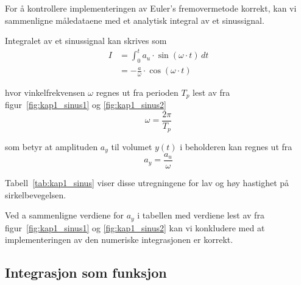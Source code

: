 \documentclass[main.tex]{subfiles}
\begin{document}




For å kontrollere implementeringen av Euler's fremovermetode korrekt, kan vi sammenligne måledataene med et analytisk integral av et sinussignal.

Integralet av et sinussignal kan skrives som
\begin{align}
    I & = \int_{0}^{t} a_u \cdot \sin{(\omega \cdot t)} \, dt \nonumber \\
      & = -\frac{a}{\omega} \cdot \cos{(\omega \cdot t)}
\end{align}

hvor vinkelfrekvensen $\omega$ regnes ut fra perioden $T_p$ lest av fra figur~\ref{fig:kap1_sinus1} og \ref{fig:kap1_sinus2}
\begin{equation}
    \omega = \frac{2\pi}{T_p}
\end{equation}

som betyr at amplituden $a_y$ til volumet $y(t)$ i beholderen kan regnes ut fra
\begin{equation}
    a_y = \frac{a_u}{\omega}
\end{equation}

Tabell~\ref{tab:kap1_sinus} viser disse utregningene for lav og høy hastighet på sirkelbevegelsen.



Ved a sammenligne verdiene for $a_y$ i tabellen med verdiene lest av fra figur~\ref{fig:kap1_sinus1} og \ref{fig:kap1_sinus2} kan vi konkludere med at implementeringen av den numeriske integrasjonen er korrekt.

\subsection{Integrasjon som funksjon}
\end{document}
